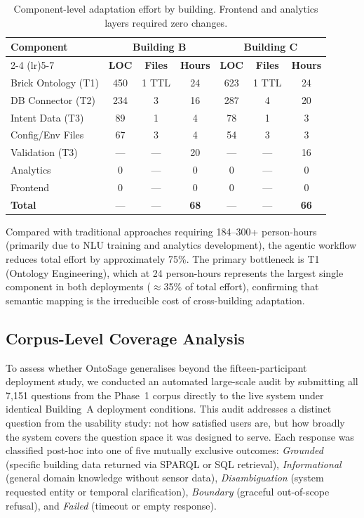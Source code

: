 \documentclass[acmsmall]{acmart}
\begin{document}
\begin{table}[t]
\centering
\caption{Component-level adaptation effort by building. Frontend and analytics layers required zero changes.}
\label{tab:adaptation-components}
\scriptsize
\begin{tabular}{@{}lcccccc@{}}
\toprule
\multirow{2}{*}{\textbf{Component}} & \multicolumn{3}{c}{\textbf{Building B}} & \multicolumn{3}{c}{\textbf{Building C}} \\
\cmidrule(lr){2-4} \cmidrule(lr){5-7}
 & \textbf{LOC} & \textbf{Files} & \textbf{Hours} & \textbf{LOC} & \textbf{Files} & \textbf{Hours} \\
\midrule
Brick Ontology (T1) & 450 & 1 TTL & 24 & 623 & 1 TTL & 24 \\
DB Connector (T2)   & 234 & 3     & 16 & 287 & 4     & 20 \\
Intent Data (T3)    &  89 & 1     &  4 &  78 & 1     &  3 \\
Config/Env Files    &  67 & 3     &  4 &  54 & 3     &  3 \\
Validation (T3)     & --- & ---   & 20 & --- & ---   & 16 \\
Analytics           &   0 & ---   &  0 &   0 & ---   &  0 \\
Frontend            &   0 & ---   &  0 &   0 & ---   &  0 \\
\midrule
\textbf{Total}      & --- & ---   & \textbf{68} & --- & --- & \textbf{66} \\
\bottomrule
\end{tabular}
\end{table}

Compared with traditional approaches requiring 184--300+ person-hours (primarily due to NLU training and analytics development), the agentic workflow reduces total effort by approximately 75\%. The primary bottleneck is T1 (Ontology Engineering), which at 24 person-hours represents the largest single component in both deployments ($\approx$35\% of total effort), confirming that semantic mapping is the irreducible cost of cross-building adaptation.

\subsection{Corpus-Level Coverage Analysis}
\label{sec:corpus-coverage}

To assess whether OntoSage generalises beyond the fifteen-participant deployment study, we conducted an automated large-scale audit by submitting all 7{,}151 questions from the Phase~1 corpus directly to the live system under identical Building~A deployment conditions. This audit addresses a distinct question from the usability study: not how satisfied users are, but how broadly the system covers the question space it was designed to serve. Each response was classified post-hoc into one of five mutually exclusive outcomes: \emph{Grounded} (specific building data returned via SPARQL or SQL retrieval), \emph{Informational} (general domain knowledge without sensor data), \emph{Disambiguation} (system requested entity or temporal clarification), \emph{Boundary} (graceful out-of-scope refusal), and \emph{Failed} (timeout or empty response).
\end{document}
